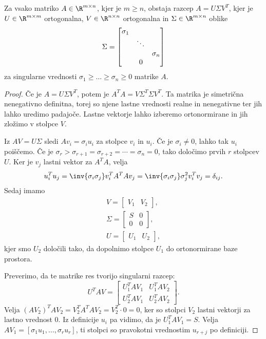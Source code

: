 
\begin{izrek}
  Za vsako matriko $A \in \R^{m \times n}$, kjer je $m \ge n$, obstaja razcep $A
  = U \Sigma V^T$, kjer je $U \in \R^{m \times m}$ ortogonalna, $V \in \R^{n
	\times n}$ ortogonalna in $\Sigma \in \R^{m \times n}$  oblike
  \[
	\Sigma =
	\begin{bmatrix}
	  \sigma_1 & & \\
			   & \ddots & \\
			   & & \sigma_n \\
	  \multicolumn{3}{c}{0}
	\end{bmatrix}
  \]
  za singularne vrednosti $\sigma_1 \ge \ldots \ge \sigma_n \ge 0$ matrike $A$.
\end{izrek}

\begin{proof}
  Če je $A = U \Sigma V^T$, potem je $A^T A = V \Sigma^T \Sigma V^T$.
  Ta matrika je simetrična nenegativno definitna, torej so njene lastne
  vrednosti realne in nenegativne ter jih lahko uredimo padajoče.
  Lastne vektorje lahko izberemo ortonormirane in jih zložimo v stolpce $V$.

  Iz $AV = U \Sigma$ sledi $A v_i = \sigma_i u_i$ za stolpce $v_i$ in $u_i$.
  Če je $\sigma_i \ne 0$, lahko tak $u_i$ poiščemo.
  Če je $\sigma_r > \sigma_{r+1} = \sigma_{r+2} = \cdots = \sigma_n = 0$, tako
  določimo prvih $r$ stolpcev $U$.
  Ker je $v_j$ lastni vektor za $A^T A$, velja
  \[
	u_i^T u_j = \inv{\sigma_i \sigma_j} v_i^T A^T A v_j = \inv{\sigma_i
	  \sigma_j} \sigma_j^2 v_i^T v_j = \delta_{ij}.
  \]
  Sedaj imamo
  \begin{gather*}
	V =
	\begin{bmatrix}
	  V_1 & V_2
	\end{bmatrix},
	\\
	\Sigma =
	\begin{bmatrix}
	  S & 0 \\
	  0 & 0
	\end{bmatrix},
	\\
	U =
	\begin{bmatrix}
	  U_1 & U_2
	\end{bmatrix},
  \end{gather*}
  kjer smo $U_2$ določili tako, da dopolnimo stolpce $U_1$ do ortonormirane baze
  prostora.

  Preverimo, da te matrike res tvorijo singularni razcep:
  \[
	U^T A V =
	\begin{bmatrix}
	  U_1^T A V_1 & U_1^T A V_2 \\
	  U_2^T A V_1 & U_2^T A V_2
	\end{bmatrix}.
  \]
  Velja $(AV_2)^T A V_2 = V_2^T A^T A V_2 = V_2^T \cdot 0 = 0$, ker so stolpci
  $V_2$ lastni vektorji za lastno vrednost $0$.
  Iz definicije $u_i$ pa vidimo, da je $U_1^T A V_1 = S$.
  Velja $A V_1 = [\sigma_1 u_1, \ldots, \sigma_r u_r]$, ti stolpci so pravokotni
  vrednostim $u_{r+j}$ po definiciji.
\end{proof}

